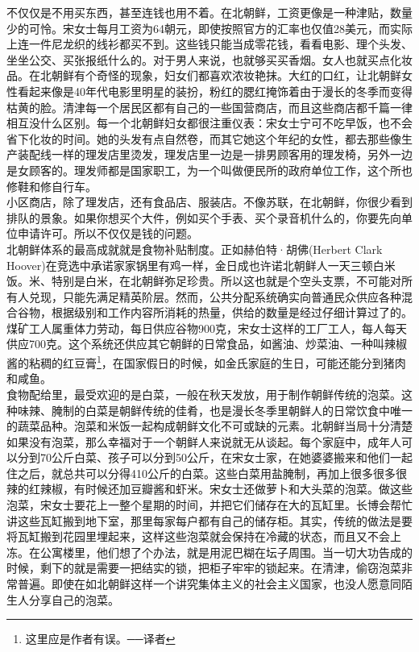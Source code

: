 \begin{multicols}{\theparacolNo}
不仅仅是不用买东西，甚至连钱也用不着。在北朝鲜，工资更像是一种津贴，数量少的可怜。宋女士每月工资为64朝元，即使按照官方的汇率也仅值28美元，而实际上连一件尼龙织的线衫都买不到。这些钱只能当成零花钱，看看电影、理个头发、坐坐公交、买张报纸什么的。对于男人来说，也就够买买香烟。女人也就买点化妆品。在北朝鲜有个奇怪的现象，妇女们都喜欢浓妆艳抹。大红的口红，让北朝鲜女性看起来像是40年代电影里明星的装扮，粉红的腮红掩饰着由于漫长的冬季而变得枯黄的脸。清津每一个居民区都有自己的一些国营商店，而且这些商店都千篇一律相互没什么区别。每一个北朝鲜妇女都很注重仪表：宋女士宁可不吃早饭，也不会省下化妆的时间。她的头发有点自然卷，而其它她这个年纪的女性，都去那些像生产装配线一样的理发店里烫发，理发店里一边是一排男顾客用的理发椅，另外一边是女顾客的。理发师都是国家职工，为一个叫做便民所的政府单位工作，这个所也修鞋和修自行车。\\

小区商店，除了理发店，还有食品店、服装店。不像苏联，在北朝鲜，你很少看到排队的景象。如果你想买个大件，例如买个手表、买个录音机什么的，你要先向单位申请许可。所以不仅仅是钱的问题。\\

北朝鲜体系的最高成就就是食物补贴制度。正如赫伯特·胡佛(Herbert Clark Hoover)在竞选中承诺家家锅里有鸡一样，金日成也许诺北朝鲜人一天三顿白米饭。米、特别是白米，在北朝鲜弥足珍贵。所以这也就是个空头支票，不可能对所有人兑现，只能先满足精英阶层。然而，公共分配系统确实向普通民众供应各种混合谷物，根据级别和工作内容所消耗的热量，供给的数量是经过仔细计算过了的。煤矿工人属重体力劳动，每日供应谷物900克，宋女士这样的工厂工人，每人每天供应700克。这个系统还供应其它朝鲜的日常食品，如酱油、炒菜油、一种叫辣椒酱的粘稠的红豆膏\footnote{这里应是作者有误。──译者}，在国家假日的时候，如金氏家庭的生日，可能还能分到猪肉和咸鱼。\\

食物配给里，最受欢迎的是白菜，一般在秋天发放，用于制作朝鲜传统的泡菜。这种味辣、腌制的白菜是朝鲜传统的佳肴，也是漫长冬季里朝鲜人的日常饮食中唯一的蔬菜品种。泡菜和米饭一起构成朝鲜文化不可或缺的元素。北朝鲜当局十分清楚如果没有泡菜，那么幸福对于一个朝鲜人来说就无从谈起。每个家庭中，成年人可以分到70公斤白菜、孩子可以分到50公斤，在宋女士家，在她婆婆搬来和他们一起住之后，就总共可以分得410公斤的白菜。这些白菜用盐腌制，再加上很多很多很辣的红辣椒，有时候还加豆瓣酱和虾米。宋女士还做萝卜和大头菜的泡菜。做这些泡菜，宋女士要花上一整个星期的时间，并把它们储存在大的瓦缸里。长博会帮忙讲这些瓦缸搬到地下室，那里每家每户都有自己的储存柜。其实，传统的做法是要将瓦缸搬到花园里埋起来，这样这些泡菜就会保持在冷藏的状态，而且又不会上冻。在公寓楼里，他们想了个办法，就是用泥巴糊在坛子周围。当一切大功告成的时候，剩下的就是需要一把结实的锁，把柜子牢牢的锁起来。在清津，偷窃泡菜非常普遍。即使在如北朝鲜这样一个讲究集体主义的社会主义国家，也没人愿意同陌生人分享自己的泡菜。\\


\end{multicols}
